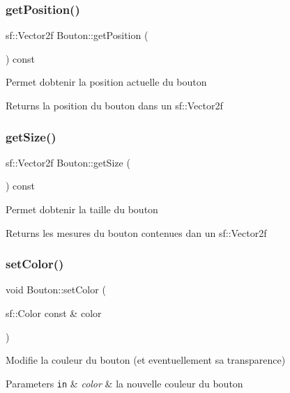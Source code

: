 \subsubsection{\texorpdfstring{get\+Position()}{getPosition()}}
{\footnotesize\ttfamily sf\+::\+Vector2f Bouton\+::get\+Position (\begin{DoxyParamCaption}{ }\end{DoxyParamCaption}) const}

Permet d\textquotesingle{}obtenir la position actuelle du bouton \begin{DoxyReturn}{Returns}
la position du bouton dans un sf\+::\+Vector2f 
\end{DoxyReturn}
\mbox{\label{classBouton_a5eb1b5b89f88a838238456c162f648e6}} 
\subsubsection{\texorpdfstring{get\+Size()}{getSize()}}
{\footnotesize\ttfamily sf\+::\+Vector2f Bouton\+::get\+Size (\begin{DoxyParamCaption}{ }\end{DoxyParamCaption}) const}

Permet d\textquotesingle{}obtenir la taille du bouton \begin{DoxyReturn}{Returns}
les mesures du bouton contenues dan un sf\+::\+Vector2f 
\end{DoxyReturn}
\mbox{\label{classBouton_a0e06118eadd748506d8e0b4c965afd5a}} 
\subsubsection{\texorpdfstring{set\+Color()}{setColor()}\hspace{0.1cm}{\footnotesize\ttfamily [1/2]}}
{\footnotesize\ttfamily void Bouton\+::set\+Color (\begin{DoxyParamCaption}\item[{sf\+::\+Color const \&}]{color }\end{DoxyParamCaption})}

Modifie la couleur du bouton (et eventuellement sa transparence) 
\begin{DoxyParams}[1]{Parameters}
\mbox{\tt in}  & {\em color} & la nouvelle couleur du bouton \\
\hline
\end{DoxyParams}
\mbox{\label{classBouton_a24afe0c72297cc0afa04dfa881655a76}} 
